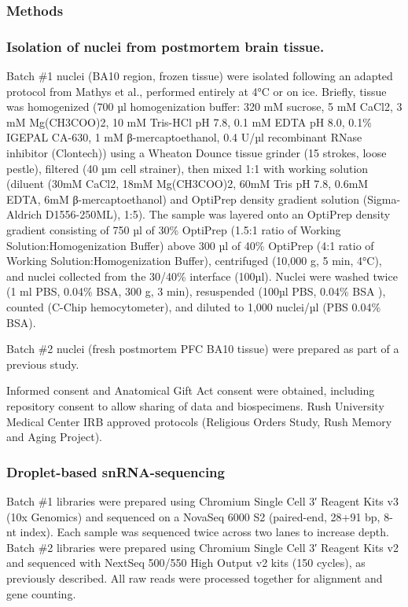 \subsubsection{Methods}

\subsubsection{Isolation of nuclei from postmortem brain tissue.}
Batch \#1 nuclei (BA10 region, frozen tissue) were isolated following an adapted protocol from Mathys et al.\supercite{Mathys2019-wb}, performed entirely at 4°C or on ice. Briefly, tissue was homogenized (700 µl homogenization buffer: 320 mM sucrose, 5 mM CaCl2, 3 mM Mg(CH3COO)2, 10 mM Tris-HCl pH 7.8, 0.1 mM EDTA pH 8.0, 0.1\% IGEPAL CA-630, 1 mM β-mercaptoethanol, 0.4 U/µl recombinant RNase inhibitor (Clontech)) using a Wheaton Dounce tissue grinder (15 strokes, loose pestle), filtered (40 µm cell strainer), then mixed 1:1 with working solution (diluent (30mM CaCl2, 18mM Mg(CH3COO)2, 60mM Tris pH 7.8, 0.6mM EDTA, 6mM β-mercaptoethanol) and OptiPrep density gradient solution (Sigma-Aldrich D1556-250ML), 1:5). The sample was layered onto an OptiPrep density gradient consisting of 750 µl of 30\% OptiPrep (1.5:1 ratio of Working Solution:Homogenization Buffer) above 300 µl of 40\% OptiPrep (4:1 ratio of Working Solution:Homogenization Buffer), centrifuged (10,000 g, 5 min, 4°C), and nuclei collected from the 30/40\% interface (100µl). Nuclei were washed twice (1 ml PBS, 0.04\% BSA, 300 g, 3 min), resuspended (100µl PBS, 0.04\% BSA ), counted (C-Chip hemocytometer), and diluted to 1,000 nuclei/µl (PBS 0.04\% BSA).

Batch \#2 nuclei (fresh postmortem PFC BA10 tissue) were prepared as part of a previous study\supercite{Mathys2019-wb}.

Informed consent and Anatomical Gift Act consent were obtained, including repository consent to allow sharing of data and biospecimens. Rush University Medical Center IRB approved protocols (Religious Orders Study, Rush Memory and Aging Project).

\subsubsection{Droplet-based snRNA-sequencing}
Batch \#1 libraries were prepared using Chromium Single Cell 3′ Reagent Kits v3 (10x Genomics) and sequenced on a NovaSeq 6000 S2 (paired-end, 28+91 bp, 8-nt index). Each sample was sequenced twice across two lanes to increase depth. Batch \#2 libraries were prepared using Chromium Single Cell 3′ Reagent Kits v2 and sequenced with NextSeq 500/550 High Output v2 kits (150 cycles), as previously described\supercite{Mathys2019-wb}. All raw reads were processed together for alignment and gene counting.

